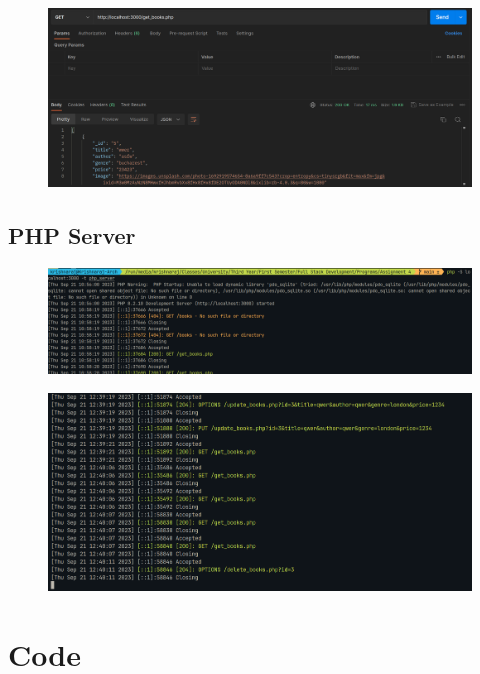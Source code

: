 \documentclass[11pt]{article}
\begin{document}
\begin{figure}[H]
    \centering
    \includegraphics[width=.95\textwidth]{screenshots/postman 3.png}
    \caption{}
\end{figure}

\subsection{PHP Server}

\begin{figure}[H]
    \centering
    \includegraphics[width=.95\textwidth]{screenshots/php server 1.png}
    \caption{}
\end{figure}
\begin{figure}[H]
    \centering
    \includegraphics[width=.95\textwidth]{screenshots/php server 2.png}
    \caption{}
\end{figure}

\section{Code}






\end{document}
